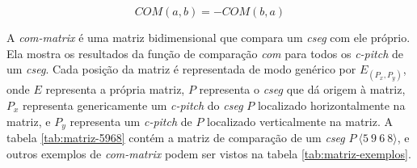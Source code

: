 \documentclass{article}
\newcommand{\eng}[1]{\textit{#1}}
\newcommand{\termo}[1]{\textit{#1}}
\begin{document}
\begin{equation}
  \label{eq:inversao-da-comparacao}
  COM(a,b)=-COM(b,a)
\end{equation}

A \termo{com-matrix} é uma matriz bidimensional que compara um
\termo{cseg} com ele próprio. Ela mostra os resultados da função de
comparação \termo{com} para todos os \termo{c-pitch} de um
\termo{cseg}. Cada posição da matriz é representada de modo genérico
por $E_(P_x,P_y)$, onde $E$ representa a própria matriz, $P$
representa o \termo{cseg} que dá origem à matriz, $P_x$ representa
genericamente um \termo{c-pitch} do \termo{cseg} $P$ localizado
horizontalmente na matriz, e $P_y$ representa um \termo{c-pitch} de
$P$ localizado verticalmente na matriz. A tabela \ref{tab:matriz-5968}
contém a matriz de comparação de um \termo{cseg}
$P\:\langle5\:9\:6\:8\rangle$, e outros exemplos de \termo{com-matrix}
podem ser vistos na tabela \ref{tab:matriz-exemplos}.

\begin{table}
  \centering
  \label{tab:matriz-exemplos}
  \caption{Exemplos de \eng{COM-matrix}}
\end{table}
\end{document}
